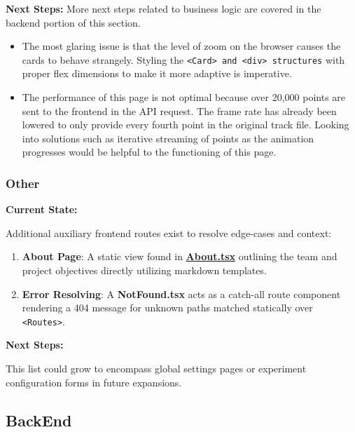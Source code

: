 \documentclass{article}
\begin{document}
\par{\textbf{Next Steps:} More next steps related to business logic are covered in the backend portion of this section.}
\begin{itemize}
  \item{The most glaring issue is that the level of zoom on the browser causes the cards to behave strangely. Styling the \texttt{<Card> and <div> structures}
  with proper flex dimensions to make it more adaptive is imperative.}
  \item{The performance of this page is not optimal because over 20,000 points are sent to the frontend in the API request. The frame rate has already been lowered to only provide every fourth
  point in the original track file. Looking into solutions such as iterative streaming of points as the animation progresses would be helpful to the functioning of this page.}
\end{itemize}

\subsubsection{Other}

\par{\textbf{Current State:}}
\par{Additional auxiliary frontend routes exist to resolve edge-cases and context:}

\begin{enumerate}

  \item{\textbf{About Page}: A static view found in \href{https://github.com/OCD-Rats-Capstone/OCD-Rat-Infrastructure/blob/main/src/ocd-rat-frontend/src/pages/About.tsx}{\textbf{About.tsx}} outlining the team and project objectives directly utilizing markdown templates.}
  \item{\textbf{Error Resolving}: A \textbf{NotFound.tsx} acts as a catch-all route component rendering a 404 message for unknown paths matched statically over \texttt{<Routes>}.}

\end{enumerate}
\par{\textbf{Next Steps:}}
\par{This list could grow to encompass global settings pages or experiment configuration forms in future expansions.}

\subsection{BackEnd}
\end{document}
